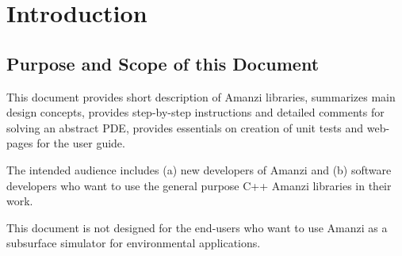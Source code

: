 
\section{Introduction}

\subsection{Purpose and Scope of this Document}
This document provides short description of Amanzi libraries, summarizes 
main design concepts, provides step-by-step instructions and detailed comments for solving 
an abstract PDE, provides essentials on creation of unit tests and web-pages for the user guide.

The intended audience includes (a) new developers of Amanzi and (b) software developers who want to use the general purpose C++ Amanzi libraries in their work.

This document is not designed for the end-users who want to use Amanzi as a subsurface simulator for environmental applications.









